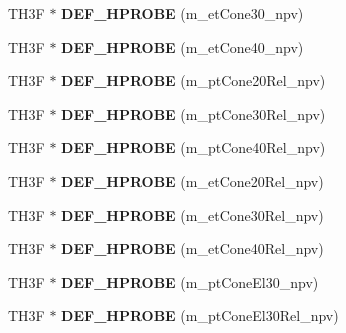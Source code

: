 \begin{DoxyCompactItemize}
\item 
\hypertarget{classHistos__Fake_ae48d00afca74361c40234312c6a84682}{
TH3F $\ast$ {\bfseries DEF\_\-HPROBE} (m\_\-etCone30\_\-npv)}
\label{classHistos__Fake_ae48d00afca74361c40234312c6a84682}

\item 
\hypertarget{classHistos__Fake_a8bc74254d7a10f12d2b5c13be21407f5}{
TH3F $\ast$ {\bfseries DEF\_\-HPROBE} (m\_\-etCone40\_\-npv)}
\label{classHistos__Fake_a8bc74254d7a10f12d2b5c13be21407f5}

\item 
\hypertarget{classHistos__Fake_a09c3d60ba694fec18fc3c0311238644b}{
TH3F $\ast$ {\bfseries DEF\_\-HPROBE} (m\_\-ptCone20Rel\_\-npv)}
\label{classHistos__Fake_a09c3d60ba694fec18fc3c0311238644b}

\item 
\hypertarget{classHistos__Fake_a7b30fc4594e2fbad79085e863c3d7317}{
TH3F $\ast$ {\bfseries DEF\_\-HPROBE} (m\_\-ptCone30Rel\_\-npv)}
\label{classHistos__Fake_a7b30fc4594e2fbad79085e863c3d7317}

\item 
\hypertarget{classHistos__Fake_ac0f1478618836a7dd4e47e674ecdd847}{
TH3F $\ast$ {\bfseries DEF\_\-HPROBE} (m\_\-ptCone40Rel\_\-npv)}
\label{classHistos__Fake_ac0f1478618836a7dd4e47e674ecdd847}

\item 
\hypertarget{classHistos__Fake_a90ad5df2bf48f436b5dff218ae614e73}{
TH3F $\ast$ {\bfseries DEF\_\-HPROBE} (m\_\-etCone20Rel\_\-npv)}
\label{classHistos__Fake_a90ad5df2bf48f436b5dff218ae614e73}

\item 
\hypertarget{classHistos__Fake_ae452154dbed537570c941f2fefd20683}{
TH3F $\ast$ {\bfseries DEF\_\-HPROBE} (m\_\-etCone30Rel\_\-npv)}
\label{classHistos__Fake_ae452154dbed537570c941f2fefd20683}

\item 
\hypertarget{classHistos__Fake_a4f6da5ad0a6fa4556aea67c5da789eb5}{
TH3F $\ast$ {\bfseries DEF\_\-HPROBE} (m\_\-etCone40Rel\_\-npv)}
\label{classHistos__Fake_a4f6da5ad0a6fa4556aea67c5da789eb5}

\item 
\hypertarget{classHistos__Fake_a71eee6a334e4988ec796552264ecb5cb}{
TH3F $\ast$ {\bfseries DEF\_\-HPROBE} (m\_\-ptConeEl30\_\-npv)}
\label{classHistos__Fake_a71eee6a334e4988ec796552264ecb5cb}

\item 
\hypertarget{classHistos__Fake_a3e8b1d2c0fa8688b768aa368ffcd1ca1}{
TH3F $\ast$ {\bfseries DEF\_\-HPROBE} (m\_\-ptConeEl30Rel\_\-npv)}
\label{classHistos__Fake_a3e8b1d2c0fa8688b768aa368ffcd1ca1}


\end{DoxyCompactItemize}
